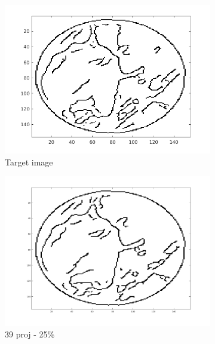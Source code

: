 \documentclass[10pt,a4paper,titlepage]{article}
\begin{document}
\begin{figure}[H]
        	
        	\begin{subfigure}[b]{0.32\textwidth}   
        	    \centering 
            	\includegraphics[width=\textwidth]{Sample1/Edges/target_auto.png}
            	\caption{Target image}
        	\end{subfigure}
        	\begin{subfigure}[b]{0.32\textwidth}   
        	    \centering 
        	    \includegraphics[width=\textwidth]{Sample1/Edges/SB/p3_auto.png}
        	    \caption{39 proj - 25\%}    
        	    \label{subfig:39p1L-D}
       		\end{subfigure}
        	\begin{subfigure}[b]{0.32\textwidth}  

\end{subfigure}
\end{figure}
\end{document}
